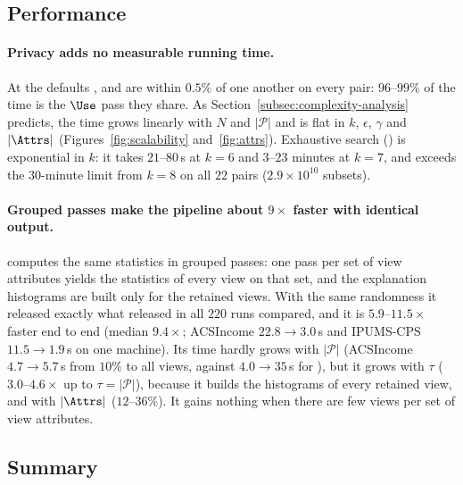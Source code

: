 \subsection{Performance}
\label{subsec:scalability}

\paragraph{Privacy adds no measurable running time.}
At the defaults \sys{}, \Bone{} and \Bthree{} are within $0.5\%$ of one another on every pair: $96$--$99\%$ of the time is the $\Use$ pass they share.
As Section~\ref{subsec:complexity-analysis} predicts, the time grows linearly with $N$ and $|\mathcal{P}|$ and is flat in $k$, $\epsilon$, $\gamma$ and $|\Attrs|$ (Figures~\ref{fig:scalability} and~\ref{fig:attrs}).
Exhaustive search (\Btwo{}) is exponential in $k$: it takes $21$--$80$\,s at $k=6$ and $3$--$23$ minutes at $k=7$, and exceeds the $30$-minute limit from $k=8$ on all $22$ pairs ($2.9\times10^{10}$ subsets).

\paragraph{Grouped passes make the pipeline about $9\times$ faster with identical output.}
\sysopt{} computes the same statistics in grouped passes: one pass per set of view attributes yields the statistics of every view on that set, and the explanation histograms are built only for the retained views.
With the same randomness it released exactly what \sys{} released in all $220$ runs compared, and it is $5.9$--$11.5\times$ faster end to end (median $9.4\times$; ACSIncome $22.8\rightarrow3.0$\,s and IPUMS-CPS $11.5\rightarrow1.9$\,s on one machine).
Its time hardly grows with $|\mathcal{P}|$ (ACSIncome $4.7\rightarrow5.7$\,s from $10\%$ to all views, against $4.0\rightarrow35$\,s for \sys{}), but it grows with $\tau$ ($3.0$--$4.6\times$ up to $\tau=|\mathcal{P}|$), because it builds the histograms of every retained view, and with $|\Attrs|$ ($12$--$36\%$).
It gains nothing when there are few views per set of view attributes.

\subsection{Summary}
\label{subsec:experiments-summary}

